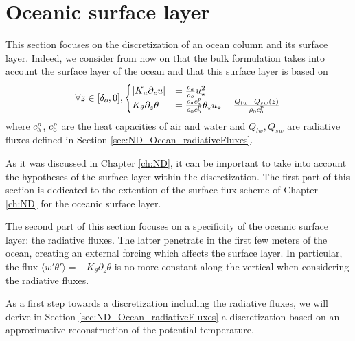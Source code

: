 \section{Oceanic surface layer}
\label{sec:OceanND_OSL}
This section focuses on the discretization of an ocean
column and its surface layer.
Indeed, we consider from now on that the bulk formulation
takes into account the surface layer of the ocean and that
this surface layer is based on
\begin{equation}
	\forall z \in [\delta_o, 0],
	\begin{cases}
	|K_u \partial_z u| &= {\frac{\rho_a}{\rho_o}}
	u_\star^2\\
	K_\theta \partial_z \theta &=
	{\frac{\rho_{\rm a} c_{\rm a}^p}
			{\rho_{\rm o} c_{\rm o}^p}}
	\theta_\star u_\star- \frac{Q_{lw} + Q_{sw}(z)}
		{\rho_{\rm o} c_{\rm o}^p}
	\end{cases}
\end{equation}
where $c_{\rm a}^p$, $c_{\rm o}^p$ are the heat capacities
of air and water and
$Q_{lw}, Q_{sw}$ are radiative fluxes defined in Section
\ref{sec:ND_Ocean_radiativeFluxes}.
\par
As it was discussed in Chapter \ref{ch:ND}, it can be important
to take into account the hypotheses of the surface layer within
the discretization. The first part of this section is dedicated
to the extention of the surface flux scheme of Chapter \ref{ch:ND}
for the oceanic surface layer.
\par
The second part of this section focuses on a specificity of the
oceanic surface layer: the radiative fluxes. The latter penetrate
in the first few meters of the ocean, creating an external forcing
which affects the surface layer. In particular, the flux
$\langle w' \theta'\rangle = -K_\theta \partial_z \theta$ is no more
constant along the vertical when considering the radiative fluxes.
\par
As a first step towards a discretization including the radiative
fluxes, we will derive in Section \ref{sec:ND_Ocean_radiativeFluxes}
a discretization based on an approximative reconstruction of the
potential temperature.
\par
% 
